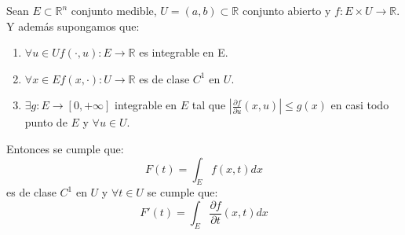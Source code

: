 \begin{teorema} 
    Sean $E \subset \mathbb{R}^n$ conjunto medible, $U = (a, b) \subset \mathbb{R}$ conjunto abierto y $f: E \times U \to \mathbb{R}$. Y además supongamos que:
    \vspace{-0.5em}
    \begin{enumerate}
        \item $\forall u \in U f(\cdot, u): E \to \mathbb{R}$ es integrable en E.
        \item $\forall x \in E f(x, \cdot): U \to \mathbb{R}$ es de clase $C^1$ en $U$.
        \item $\exists g: E \to [0, +\infty]$ integrable en $E$ tal que $|\frac{\partial f}{\partial u}(x, u)| \leq g(x)$ en casi todo punto de $E$ y $\forall u \in U$.
    \end{enumerate}
    Entonces se cumple que:
    $$ F(t) = \int_{E}f(x,t)dx $$ es de clase $C^1$ en $U$ y $\forall t \in U$ se cumple que: $$ F'(t) = \int_{E}\frac{\partial f}{\partial t}(x, t)dx $$
\end{teorema}
